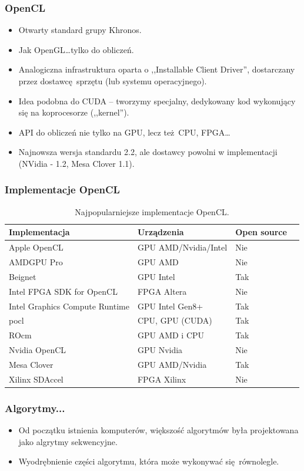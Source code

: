 \documentclass[dvipsnames,table]{beamer}
\begin{document}
\begin{frame}
	\frametitle{OpenCL}
\begin{itemize}
	\item Otwarty standard grupy Khronos.
	\item Jak OpenGL\ldots tylko do obliczeń.
	\item Analogiczna infrastruktura oparta o ,,Installable Client Driver'', dostarczany przez dostawcę sprzętu (lub systemu operacyjnego).
	\item Idea podobna do CUDA -- tworzymy specjalny, dedykowany kod wykonujący się na koprocesorze (,,kernel'').
	\item API do obliczeń nie tylko na GPU, lecz też CPU, FPGA\ldots
	\item Najnowsza wersja standardu 2.2, ale dostawcy powolni w implementacji (NVidia - 1.2, Mesa Clover 1.1).
\end{itemize}
\end{frame}


\begin{frame}[fragile]
	\frametitle{Implementacje OpenCL}
\begin{table}[]
\centering
\caption{Najpopularniejsze implementacje OpenCL.}
\label{porownanie}
\scriptsize
\begin{tabular}{llll}
\hline
Implementacja &  Urządzenia  & Open source   \\ \hline
Apple OpenCL & GPU AMD/Nvidia/Intel & Nie \\
AMDGPU Pro & GPU AMD & Nie \\
Beignet & GPU Intel & Tak \\
Intel FPGA SDK for OpenCL & FPGA Altera & Nie \\
Intel Graphics Compute Runtime & GPU Intel Gen8+ & Tak \\
pocl & CPU, GPU (CUDA) & Tak \\
ROcm & GPU AMD i CPU & Tak \\
Nvidia OpenCL & GPU Nvidia & Nie \\
Mesa Clover & GPU AMD/Nvidia & Tak \\
Xilinx SDAccel & FPGA Xilinx & Nie \\ \hline
\end{tabular}
\normalsize
\end{table}
\end{frame}

\begin{frame}
	\frametitle{Algorytmy...}
\begin{itemize}
	\item Od początku istnienia komputerów, większość algorytmów była projektowana jako algrytmy sekwencyjne.
	\item Wyodrębnienie części algorytmu, która może wykonywać się równolegle.
\end{itemize}
\end{frame}
\end{document}
